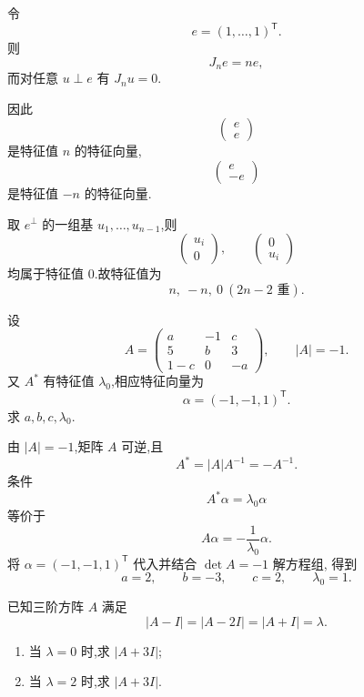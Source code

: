 \begin{solution}
令
\[
e=(1,\ldots,1)^{\mathsf T}.
\]
则
\[
J_ne=ne,
\]
而对任意 $u\perp e$ 有 $J_nu=0$.

因此
\[
\begin{pmatrix}e\\e\end{pmatrix}
\]
是特征值 $n$ 的特征向量,
\[
\begin{pmatrix}e\\-e\end{pmatrix}
\]
是特征值 $-n$ 的特征向量.

取 $e^\perp$ 的一组基 $u_1,\ldots,u_{n-1}$,则
\[
\begin{pmatrix}u_i\\0\end{pmatrix},
\qquad
\begin{pmatrix}0\\u_i\end{pmatrix}
\]
均属于特征值 $0$.故特征值为
\[
\boxed{n,\ -n,\ 0\ (2n-2\text{ 重})}.
\]
\end{solution}


\begin{example}
设
\[
A=
\begin{pmatrix}
a&-1&c\\
5&b&3\\
1-c&0&-a
\end{pmatrix},
\qquad
|A|=-1.
\]
又 $A^*$ 有特征值 $\lambda_0$,相应特征向量为
\[
\alpha=(-1,-1,1)^{\mathsf T}.
\]
求 $a,b,c,\lambda_0$.
\end{example}
\exampleblank

\begin{solution}
由 $|A|=-1$,矩阵 $A$ 可逆,且
\[
A^*=|A|A^{-1}=-A^{-1}.
\]
条件
\[
A^*\alpha=\lambda_0\alpha
\]
等价于
\[
A\alpha=-\dfrac{1}{\lambda_0}\alpha.
\]
将 $\alpha=(-1,-1,1)^{\mathsf T}$ 代入并结合 $\det A=-1$ 解方程组,
得到
\[
\boxed{
a=2,\qquad b=-3,\qquad c=2,\qquad \lambda_0=1.
}
\]
\end{solution}


\begin{example}
已知三阶方阵 $A$ 满足
\[
|A-I|=|A-2I|=|A+I|=\lambda.
\]
\begin{enumerate}
    \item 当 $\lambda=0$ 时,求 $|A+3I|$;
    \item 当 $\lambda=2$ 时,求 $|A+3I|$.
\end{enumerate}
\end{example}
\exampleblank

